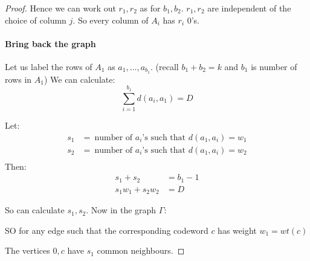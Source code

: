 \documentclass[]{article}
\theoremstyle{definition}
\theoremstyle{remark}
\numberwithin{equation}{section}
\begin{document}
\begin{proof}
				Hence we can work out $r_1, r_2$ as for $b_1, b_2$. $r_1, r_2$ are independent of the choice of column $j$. So every column of $A_i$ has $r_i$ 0's.

			\paragraph*{Bring back the graph}
				Let us label the rows of $A_1$ as $a_1, \hdots, a_{b_1}$. (recall $b_1 + b_2 = k$ and $b_1$ is number of rows in $A_1$) We can calculate:
				\[
					\sum_{i=1}^{b_1} d(a_i, a_1) = D
				\]

				Let:
				\begin{align*}
					s_1 &=\ \text{number of $a_i$'s such that $d(a_1, a_i) = w_1$}\\
					s_2 &=\ \text{number of $a_i$'s such that $d(a_1, a_i) = w_2$}\\
				\end{align*}
				Then:
				\begin{align*}
					s_1 + s_2 &= b_1 -1 \\
					s_1 w_1 + s_2 w_2 &= D
				\end{align*}

				So can calculate $s_1, s_2$.
				Now in the graph $\Gamma:$
					\begin{figure}[H]
						\centering
					\end{figure}
				SO for any edge such that the corresponding codeword $c$ has weight $w_1 = wt(c)$

					\begin{figure}[H]
						\centering
					\end{figure}
				The vertices $0, c$ have $s_1$ common neighbours.


\end{proof}
\end{document}
